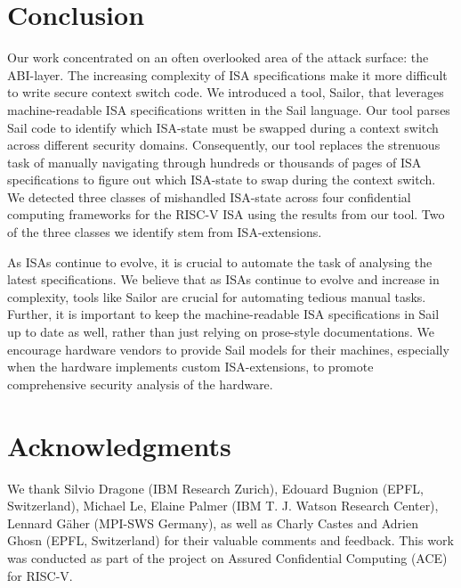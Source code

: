 \section{Conclusion}

Our work concentrated on an often overlooked area of the attack surface: the ABI-layer. 
The increasing complexity of ISA specifications make it more difficult to write secure context switch code. We introduced a tool, Sailor, that leverages machine-readable ISA specifications written in the Sail language. 
Our tool parses Sail code to identify which ISA-state must be swapped during a context switch across different security domains. 
Consequently, our tool replaces the strenuous task of manually navigating through hundreds or thousands of pages of ISA specifications to figure out which ISA-state to swap during the context switch. 
We detected three classes of mishandled ISA-state across four confidential computing frameworks for the RISC-V ISA using the results from our tool. 
Two of the three classes we identify stem from ISA-extensions. 

As ISAs continue to evolve, it is crucial to automate the task of analysing the latest specifications. 
We believe that as ISAs continue to evolve and increase in complexity, tools like Sailor are crucial for automating tedious manual tasks. 
Further, it is important to keep the machine-readable ISA specifications in Sail up to date as well, rather than just relying on prose-style documentations. 
We encourage hardware vendors to provide Sail models for their machines, especially when the hardware implements custom ISA-extensions, to promote comprehensive security analysis of the hardware. 






\section*{Acknowledgments}
We thank Silvio Dragone (IBM Research Zurich), Edouard Bugnion (EPFL, Switzerland), Michael Le, Elaine Palmer (IBM T. J. Watson Research Center), Lennard Gäher (MPI-SWS Germany), as well as Charly Castes and Adrien Ghosn (EPFL, Switzerland) for their valuable comments and feedback.
This work was conducted as part of the project on Assured Confidential Computing (ACE) for RISC-V.
